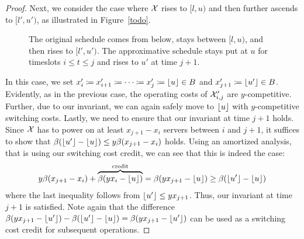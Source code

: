 \begin{proof}
Next, we consider the case where $\mathcal{X}$ rises to $[l,u)$ and then further ascends to $[l',u')$, as illustrated in Figure~\ref{todo}.
\begin{figure}[H]
\centering
	
\caption{The original schedule comes from below, stays between $[l,u)$, and then rises to $[l',u')$. The approximative schedule stays put at $u$ for timeslots $i\le t\le j$ and rises to $u'$ at time $j+1$.}
\end{figure}
In this case, we set $x_i'\coloneqq x_{i+1}'\coloneqq\dotsb\coloneqq x_j'\coloneqq \lfloor u\rfloor\in B$ and $x_{j+1}'\coloneqq \lfloor u'\rfloor\in B$. Evidently, as in the previous case, the operating costs of $\mathcal{X}_{i,j}'$ are $y$-competitive. Further, due to our invariant, we can again safely move to $\lfloor u\rfloor$ with $y$-competitive switching costs. Lastly, we need to ensure that our invariant at time $j+1$ holds. Since $\mathcal{X}$ has to power on at least $x_{j+1}-x_i$ servers between $i$ and $j+1$, it suffices to show that $\beta(\lfloor u'\rfloor-\lfloor u\rfloor)\le y\beta(x_{j+1}-x_i)$ holds. Using an amortized analysis, that is using our switching cost credit, we can see that this is indeed the case:
\begin{align*}
	y\beta(x_{j+1}-x_i)+\overbrace{\beta(yx_i-\lfloor u\rfloor)}^{\text{credit}}=\beta(yx_{j+1}-\lfloor u\rfloor)\ge\beta(\lfloor u'\rfloor-\lfloor u\rfloor)
\end{align*}
where the last inequality follows from $\lfloor u'\rfloor\le yx_{j+1}$. Thus, our invariant at time $j+1$ is satisfied. Note again that the difference $\beta(yx_{j+1}-\lfloor u'\rfloor)-\beta(\lfloor u'\rfloor-\lfloor u\rfloor)=\beta(yx_{j+1}-\lfloor u'\rfloor)$ can be used as a switching cost credit for subsequent operations. 
	

\end{proof}
